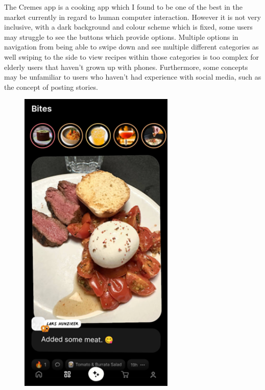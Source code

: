 \documentclass[]{project_interim}
\begin{document}
The Cremes app is a cooking app which I found to be one of the best in the market currently in regard to human computer interaction. However it is not very inclusive, with a dark background and colour scheme which is fixed, some users may struggle to see the buttons which provide options. Multiple options in navigation from being able to swipe down and see multiple different categories as well swiping to the side to view recipes within those categories is too complex for elderly users that haven’t grown up with phones. Furthermore, some concepts may be unfamiliar to users who haven’t had experience with social media, such as the concept of posting stories.



\begin{figure}[ht!]
  \centering
  \begin{minipage}[t]{0.4\textwidth}
    \includegraphics[width=20em]{cremeImage1.png}
  \end{minipage}
  \hfill
  \begin{minipage}[t]{0.4\textwidth}

\end{minipage}
\end{figure}
\end{document}

